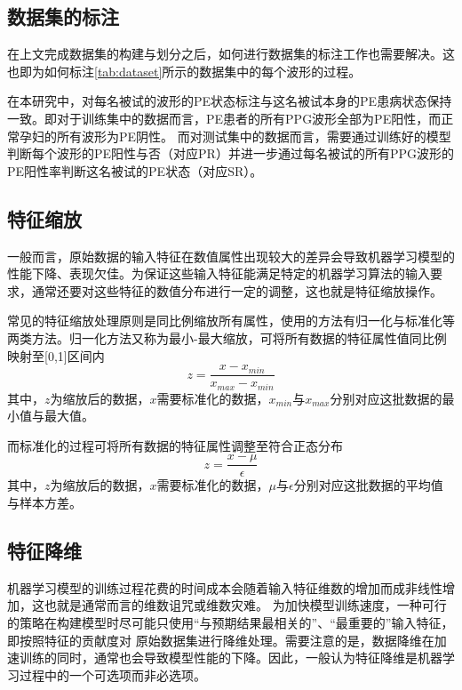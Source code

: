 \subsection{数据集的标注}
在上文完成数据集的构建与划分之后，如何进行数据集的标注工作也需要解决。这也即为如何标注\autoref{tab:dataset}所示的数据集中的每个波形的过程。

在本研究中，对每名被试的波形的PE状态标注与这名被试本身的PE患病状态保持一致。即对于训练集中的数据而言，PE患者的所有PPG波形全部为PE阳性，而正常孕妇的所有波形为PE阴性。
而对测试集中的数据而言，需要通过训练好的模型判断每个波形的PE阳性与否（对应PR）并进一步通过每名被试的所有PPG波形的PE阳性率判断这名被试的PE状态（对应SR）。
\subsection{特征缩放}
一般而言，原始数据的输入特征在数值属性出现较大的差异会导致机器学习模型的性能下降、表现欠佳\cite{Aurélien2018}。为保证这些输入特征能满足特定的机器学习算法的输入要求，通常还要对这些特征的数值分布进行一定的调整，这也就是特征缩放操作。

常见的特征缩放处理原则是同比例缩放所有属性，使用的方法有归一化与标准化等两类方法。归一化方法又称为最小-最大缩放，可将所有数据的特征属性值同比例映射至[0,1]区间内
\begin{equation}
    \label{equ:maxmin}
    z = \frac{x - x_{min}}{x_{max}-x_{min}}
\end{equation}
其中，$z$为缩放后的数据，$x$需要标准化的数据，$x_{min}$与$x_{max}$分别对应这批数据的最小值与最大值。

而标准化的过程可将所有数据的特征属性调整至符合正态分布
\begin{equation}
    \label{equ:normalization}
    z = \frac{x - \mu}{\epsilon}
\end{equation}
其中，$z$为缩放后的数据，$x$需要标准化的数据，$\mu$与$\epsilon$分别对应这批数据的平均值与样本方差。

\subsection{特征降维}
机器学习模型的训练过程花费的时间成本会随着输入特征维数的增加而成非线性增加，这也就是通常而言的维数诅咒或维数灾难。
为加快模型训练速度，一种可行的策略在构建模型时尽可能只使用“与预期结果最相关的”、“最重要的”输入特征，即按照特征的贡献度对
原始数据集进行降维处理。需要注意的是，数据降维在加速训练的同时，通常也会导致模型性能的下降。因此，一般认为特征降维是机器学习过程中的一个可选项而非必选项。

